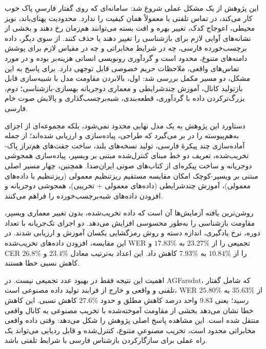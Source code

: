 
این پژوهش از یک مشکل عملی شروع شد: سامانه‌ای که روی گفتار فارسیِ پاک خوب کار می‌کند، در تماس تلفنی یا  معمولاً همان کیفیت را ندارد. محدودیت پهنای‌باند، نویز محیطی، اعوجاج کدک، تغییر بهره و افت بسته می‌توانند هم‌زمان رخ دهند و بخشی از نشانه‌های آوایی لازم برای بازشناسی را تغییر دهند یا حذف کنند. از سوی دیگر، داده برچسب‌خورده فارسی، چه در شرایط مخابراتی و چه در مقیاس لازم برای پوشش دامنه‌های متنوع، محدود است و گردآوری رونویسی انسانی هزینه‌‌‌بر بوده و در مورد تماس‌های واقعی، ملاحظات حریم خصوصی قابل توجهی دارد. برای پاسخ به این مشکل، دو مسیر مکمل بررسی شد: اول، بالابردن مقاومت مدل با شبیه‌سازی قابل بازتولید کانال، آموزش چندشرایطی و معماری دوجریانه بهسازی-بازشناسی؛ دوم، بزرگ‌ترکردن داده با گردآوری، قطعه‌بندی، شبه‌برچسب‌گذاری و پالایش صوت خام فارسی.

دستاورد این پژوهش به یک مدل نهایی محدود نمی‌شود، بلکه مجموعه‌ای از اجزای به‌هم‌پیوسته را در بر می‌گیرد که طراحی، پیاده‌سازی و ارزیابی شده‌اند؛ از جمله آماده‌سازی چند پیکرهٔ فارسی، تولید نسخه‌های بلند، ساخت جفت‌های هم‌تراز پاک-تخریب‌شده، تعریف دو خط مبنای کنترل‌شده مبتنی بر ویسپر، پیاده‌سازی همجوشی دوجریانه و ساخت پیکره‌ای از کتاب‌های صوتی ایران‌صدا. همچنین، چهار مسیر اصلی مبتنی بر ویسپر-کوچک امکان مقایسه مستقیم ریزتنظیم معمولی (ریزتنظیم با داده‌های معمولی)، آموزش چندشرایطی (داده‌های معمولی + تخریبی)، همجوشی دوجریانه و افزودن داده‌های شبه‌برچسب‌خورده را فراهم می‌کنند.



روشن‌ترین یافته آزمایش‌ها آن است که داده تخریب‌شده، بدون تغییر معماری ویسپر، مقاومت بازشناسی را به‌طور محسوسی افزایش می‌دهد. دو اجرای تک‌جریانه با تعداد دوره، نرخ یادگیری، اندازه دسته و روش رمزگشایی یکسان آموزش و ارزیابی شدند. در این مقایسه، افزودن داده‌های تخریب‌شده WER تجمیعی را از $23.27\%$ به $17.83\%$ و CER را از $10.84\%$ به $7.93\%$ کاهش داد. این اعداد به‌ترتیب معادل $23.4\%$ و $26.8\%$ کاهش نسبی خطا هستند.

اهمیت این نتیجه فقط در بهبود عدد تجمیعی نیست. در AGFarsdat، که شامل گفتار تلفنی و  واقعی و خارج از فرایند تولید داده مصنوعی است، WER از $35.63\%$ به $25.80\%$ رسید؛ یعنی $9.83$ واحد درصد کاهش مطلق و حدود $27.6\%$ کاهش نسبی. این کاهش خطا نشان می‌دهد بخشی از مقاومت آموخته‌شده با تخریب مصنوعی به کانال واقعی منتقل شده است. این مشاهده پاسخ اصلی پژوهش را شکل می‌دهد: وقتی داده واقعی مخابراتی محدود است، تخریب مصنوعیِ متنوع، کنترل‌شده و قابل ردیابی می‌تواند یک راه عملی برای سازگارکردن بازشناس فارسی با شرایط تلفنی باشد.

